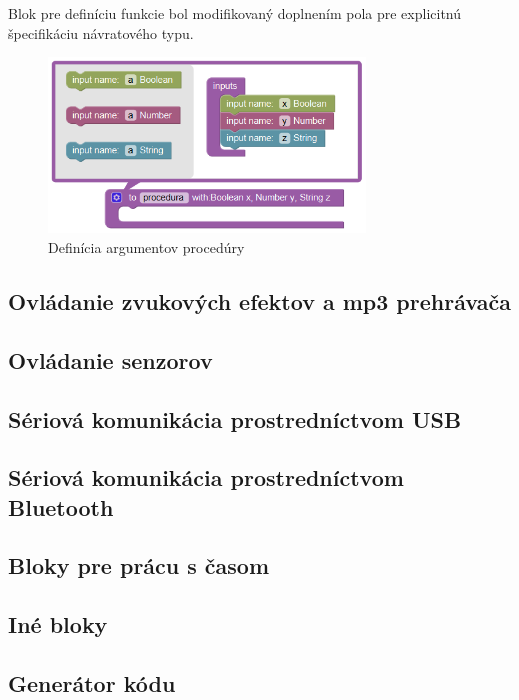 Blok pre definíciu funkcie bol modifikovaný doplnením pola pre explicitnú špecifikáciu návratového typu.

\begin{figure}
\centerline{\includegraphics[width=0.75\textwidth]{images/pocedure-definition}}
\caption[Definícia argumentov procedúry]{Definícia argumentov procedúry}
\label{obr:pocedure-definition}
\end{figure}

\subsection{Ovládanie zvukových efektov a mp3 prehrávača}



\subsection{Ovládanie senzorov}

\subsection{Sériová komunikácia prostredníctvom USB}

\subsection{Sériová komunikácia prostredníctvom Bluetooth}


\subsection{Bloky pre prácu s časom}


\subsection{Iné bloky}


\subsection{Generátor kódu}















